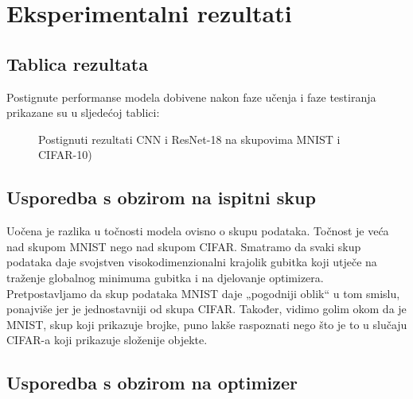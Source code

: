 \chapter{Eksperimentalni rezultati}

\section{Tablica rezultata}

Postignute performanse modela dobivene nakon faze učenja i faze testiranja prikazane su u sljedećoj tablici:

\begin{figure}[h]
	\caption{Postignuti rezultati CNN i ResNet-18 na skupovima MNIST i CIFAR-10)}
	\label{performancetable}
\end{figure}

\bigskip

\section{Usporedba s obzirom na ispitni skup}

Uočena je razlika u točnosti modela ovisno o skupu podataka. Točnost je veća nad skupom MNIST nego nad skupom CIFAR. Smatramo da svaki skup podataka daje svojstven visokodimenzionalni krajolik gubitka koji utječe na traženje globalnog minimuma gubitka i na djelovanje optimizera. Pretpostavljamo da skup podataka MNIST daje „pogodniji oblik“ u tom smislu, ponajviše jer je jednostavniji od skupa CIFAR.  Također, vidimo golim okom da je MNIST, skup koji prikazuje brojke, puno lakše raspoznati nego što je to u slučaju CIFAR-a koji prikazuje složenije objekte.

\bigskip

\section{Usporedba s obzirom na optimizer}

